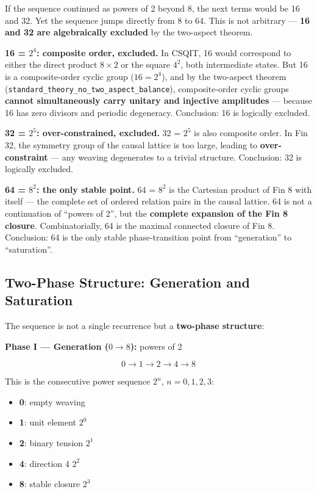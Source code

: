 \documentclass[aps,prd,twocolumn,nofootinbib,floatfix]{revtex4-2}
\begin{document}
If the sequence continued as powers of 2 beyond 8, the next terms would be 16 and 32. Yet the sequence jumps directly from 8 to 64. This is not arbitrary --- \textbf{16 and 32 are algebraically excluded} by the two-aspect theorem.

\textbf{16 = $2^4$: composite order, excluded.} In CSQIT, 16 would correspond to either the direct product $8 \times 2$ or the square $4^2$, both intermediate states. But 16 is a composite-order cyclic group ($16 = 2^4$), and by the two-aspect theorem (\texttt{standard\_theory\_no\_two\_aspect\_balance}), composite-order cyclic groups \textbf{cannot simultaneously carry unitary and injective amplitudes} --- because 16 has zero divisors and periodic degeneracy. Conclusion: 16 is logically excluded.

\textbf{32 = $2^5$: over-constrained, excluded.} 32 = $2^5$ is also composite order. In Fin 32, the symmetry group of the causal lattice is too large, leading to \textbf{over-constraint} --- any weaving degenerates to a trivial structure. Conclusion: 32 is logically excluded.

\textbf{64 = $8^2$: the only stable point.} 64 = $8^2$ is the Cartesian product of Fin 8 with itself --- the complete set of ordered relation pairs in the causal lattice. 64 is not a continuation of ``powers of 2'', but the \textbf{complete expansion of the Fin 8 closure}. Combinatorially, 64 is the maximal connected closure of Fin 8. Conclusion: 64 is the only stable phase-transition point from ``generation'' to ``saturation''.

\subsection{Two-Phase Structure: Generation and Saturation}

The sequence is not a single recurrence but a \textbf{two-phase structure}:

\textbf{Phase I --- Generation ($0 \to 8$):} powers of 2

\[
0 \to 1 \to 2 \to 4 \to 8
\]

This is the consecutive power sequence $2^n$, $n = 0, 1, 2, 3$:
\begin{itemize}
    \item \textbf{0}: empty weaving
    \item \textbf{1}: unit element $2^0$
    \item \textbf{2}: binary tension $2^1$
    \item \textbf{4}: direction 4 $2^2$
    \item \textbf{8}: stable closure $2^3$
\end{itemize}
\end{document}
